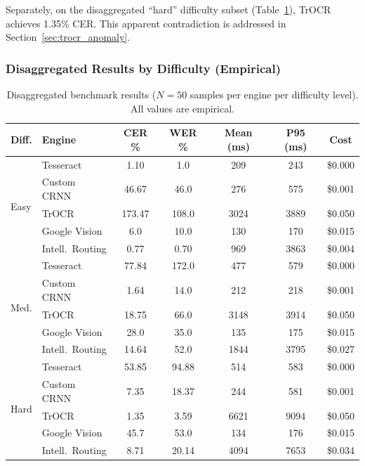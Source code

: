 \documentclass[12pt,a4paper]{article}
\begin{document}
Separately, on the disaggregated ``hard'' difficulty subset
(Table~\ref{tab:disaggregated}), TrOCR achieves 1.35\% CER. This
apparent contradiction is addressed in
Section~\ref{sec:trocr_anomaly}.

\subsubsection{Disaggregated Results by Difficulty (Empirical)}
\label{sec:disaggregated}

\begin{table}[H]
  \centering
  \small
  \begin{tabular}{llccccc}
    \toprule
    \textbf{Diff.} & \textbf{Engine} & \textbf{CER \%}
    & \textbf{WER \%} & \textbf{Mean (ms)} & \textbf{P95 (ms)}
    & \textbf{Cost} \\
    \midrule
    \multirow{5}{*}{Easy}
    & Tesseract          & 1.10   & 1.0   & 209  & 243  & \$0.000 \\
    & Custom CRNN        & 46.67  & 46.0  & 276  & 575  & \$0.001 \\
    & TrOCR              & 173.47 & 108.0 & 3024 & 3889 & \$0.050 \\
    & Google Vision      & 6.0    & 10.0  & 130  & 170  & \$0.015 \\
    & Intell.\ Routing   & 0.77   & 0.70  & 969  & 3863 & \$0.004 \\
    \midrule
    \multirow{5}{*}{Med.}
    & Tesseract          & 77.84  & 172.0 & 477  & 579  & \$0.000 \\
    & Custom CRNN        & 1.64   & 14.0  & 212  & 218  & \$0.001 \\
    & TrOCR              & 18.75  & 66.0  & 3148 & 3914 & \$0.050 \\
    & Google Vision      & 28.0   & 35.0  & 135  & 175  & \$0.015 \\
    & Intell.\ Routing   & 14.64  & 52.0  & 1844 & 3795 & \$0.027 \\
    \midrule
    \multirow{5}{*}{Hard}
    & Tesseract          & 53.85  & 94.88 & 514  & 583  & \$0.000 \\
    & Custom CRNN        & 7.35   & 18.37 & 244  & 581  & \$0.001 \\
    & TrOCR              & 1.35   & 3.59  & 6621 & 9094 & \$0.050 \\
    & Google Vision      & 45.7   & 53.0  & 134  & 176  & \$0.015 \\
    & Intell.\ Routing   & 8.71   & 20.14 & 4094 & 7653 & \$0.034 \\
    \bottomrule
  \end{tabular}
  \caption{Disaggregated benchmark results ($N=50$ samples per engine
    per difficulty level). All values are empirical.}
  \label{tab:disaggregated}
\end{table}
\end{document}
